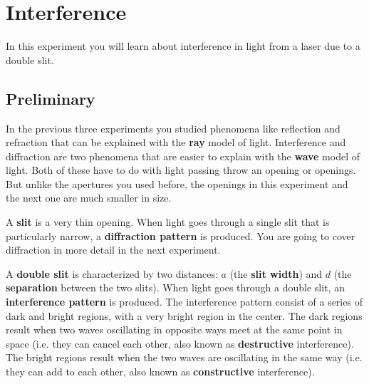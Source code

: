 \setcounter{chapter}{9}
\chapter{Interference}
In this experiment you will learn about interference in light from a laser due to a double slit.
\section{Preliminary}
In the previous three experiments you studied phenomena like reflection and refraction that can be explained with the \textbf{ray} model of light. Interference and diffraction are two phenomena that are easier to explain with the \textbf{wave} model of light. Both of these have to do with light passing throw an opening or openings. But unlike the apertures you used before, the openings in this experiment and the next one are much smaller in size.

A \textbf{slit} is a very thin opening. When light goes through a single slit that is particularly narrow, a \textbf{diffraction pattern} is produced. You are going to cover diffraction in more detail in the next experiment.

A \textbf{double slit} is characterized by two distances: $a$ (the \textbf{slit width}) and $d$ (the \textbf{separation} between the two slits). When light goes through a double slit, an \textbf{interference pattern} is produced. The interference pattern consist of a series of dark and bright regions, with a very bright region in the center. The dark regions result when two waves oscillating in opposite ways meet at the same point in space (i.e. they can cancel each other, also known as \textbf{destructive} interference). The bright regions result when the two waves are oscillating in the same way (i.e. they can add to each other, also known as \textbf{constructive} interference).

